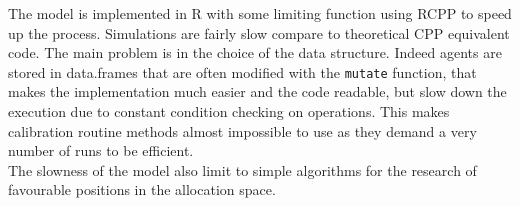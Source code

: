 \documentclass[a4paper,twoside, justified,marginals=raggedright, nobib]{tufte-handout}
\begin{document}
The model is implemented in R with some limiting function using RCPP to speed up the process. Simulations are fairly slow compare to theoretical CPP equivalent code. The main problem is in the choice of the data structure. Indeed agents are stored in data.frames that are often modified with the \verb|mutate| function, that makes the implementation much easier and the code readable, but slow down the execution due to constant condition checking on operations. This makes calibration routine methods almost impossible to use as they demand a very number of runs to be efficient.\\
\indent The slowness of the model also limit to simple algorithms for the research of favourable positions in the allocation space.
%
%
%
%
\end{document}
